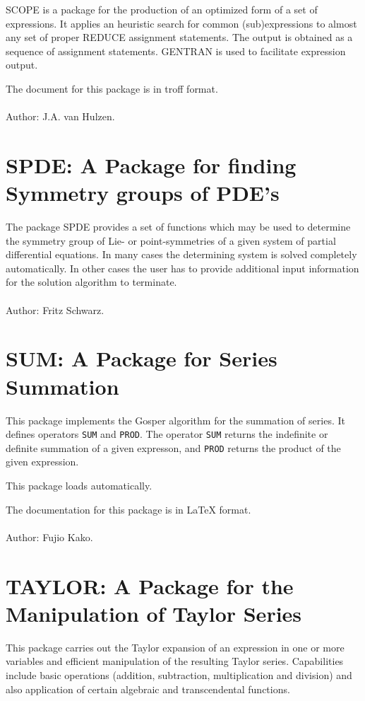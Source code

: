 SCOPE is a package for the production of an optimized form of a set of
expressions.  It applies an heuristic search for common (sub)expressions
to almost any set of proper REDUCE assignment statements.  The
output is obtained as a sequence of assignment statements.  GENTRAN is
used to facilitate expression output.

The document for this package is in troff format.
\\ \\
Author:  J.A. van Hulzen.

\section{SPDE: A Package for finding Symmetry groups of {PDE}'s}

The package SPDE provides a set of functions which may be used to
determine the symmetry group of Lie- or point-symmetries of a given system
of partial differential equations. In many cases the determining system is
solved completely automatically. In other cases the user has to provide
additional input information for the solution algorithm to terminate.
\\ \\
Author: Fritz Schwarz.

\section{SUM:  A Package for Series Summation} 

This package implements the Gosper algorithm for the summation of series.
It defines operators {\tt SUM} and {\tt PROD}.  The operator {\tt SUM}
returns the indefinite or definite summation of a given expresson, and
{\tt PROD} returns the product of the given expression.

This package loads automatically.

The documentation for this package is in {\LaTeX} format.
\\ \\
Author: Fujio Kako.

\section{TAYLOR: A Package for the Manipulation of Taylor Series}

This package carries out the Taylor expansion of an expression in one or
more variables and efficient manipulation of the resulting Taylor series.
Capabilities include basic operations (addition, subtraction,
multiplication and division) and also application of certain algebraic and
transcendental functions.

